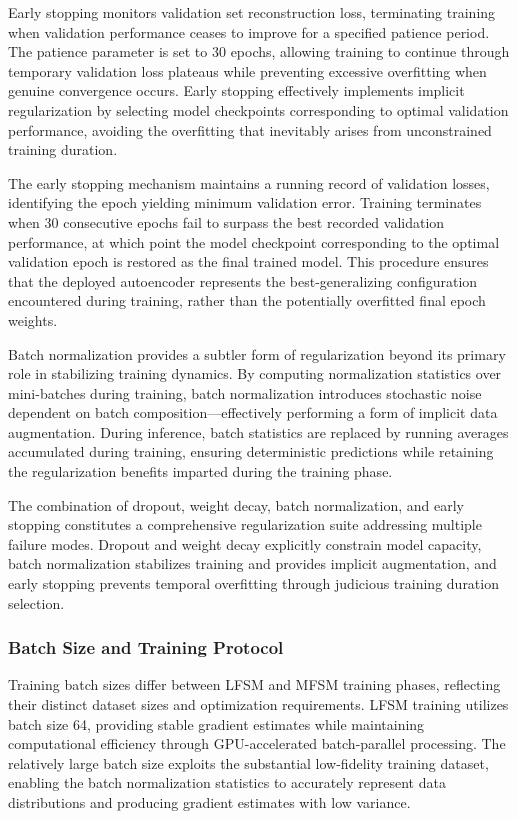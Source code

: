 \documentclass[12pt,a4paper]{report}
\begin{document}
Early stopping monitors validation set reconstruction loss, terminating training when validation performance ceases to improve for a specified patience period. The patience parameter is set to 30 epochs, allowing training to continue through temporary validation loss plateaus while preventing excessive overfitting when genuine convergence occurs. Early stopping effectively implements implicit regularization by selecting model checkpoints corresponding to optimal validation performance, avoiding the overfitting that inevitably arises from unconstrained training duration.

The early stopping mechanism maintains a running record of validation losses, identifying the epoch yielding minimum validation error. Training terminates when 30 consecutive epochs fail to surpass the best recorded validation performance, at which point the model checkpoint corresponding to the optimal validation epoch is restored as the final trained model. This procedure ensures that the deployed autoencoder represents the best-generalizing configuration encountered during training, rather than the potentially overfitted final epoch weights.

Batch normalization provides a subtler form of regularization beyond its primary role in stabilizing training dynamics. By computing normalization statistics over mini-batches during training, batch normalization introduces stochastic noise dependent on batch composition—effectively performing a form of implicit data augmentation. During inference, batch statistics are replaced by running averages accumulated during training, ensuring deterministic predictions while retaining the regularization benefits imparted during the training phase.

The combination of dropout, weight decay, batch normalization, and early stopping constitutes a comprehensive regularization suite addressing multiple failure modes. Dropout and weight decay explicitly constrain model capacity, batch normalization stabilizes training and provides implicit augmentation, and early stopping prevents temporal overfitting through judicious training duration selection.

\subsubsection{Batch Size and Training Protocol}

Training batch sizes differ between LFSM and MFSM training phases, reflecting their distinct dataset sizes and optimization requirements. LFSM training utilizes batch size 64, providing stable gradient estimates while maintaining computational efficiency through GPU-accelerated batch-parallel processing. The relatively large batch size exploits the substantial low-fidelity training dataset, enabling the batch normalization statistics to accurately represent data distributions and producing gradient estimates with low variance.
\end{document}
